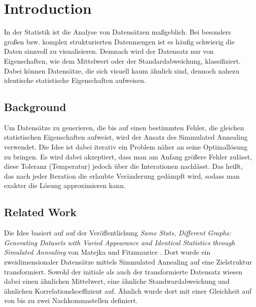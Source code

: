 \documentclass[sigconf]{acmart}
\begin{document}


\maketitle

\let\thefootnote\relax{}


\section{Introduction}

In der Statistik ist die Analyse von Datensätzen maßgeblich. Bei besonders großen bzw. komplex strukturierten Datenmengen ist es häufig schwierig die Daten sinnvoll zu visualisieren. Demnach wird der Datensatz nur von Eigenschaften, wie dem Mittelwert oder der Standardabweichung, klassifiziert. Dabei können Datensätze, die sich visuell kaum ähnlich sind, dennoch nahezu identische statistische Eigenschaften aufweisen. 

\subsection{Background}

Um Datensätze zu generieren, die bis auf einen bestimmten Fehler, die gleichen statistischen Eigenschaften aufweist, wird der Ansatz des Simmulated Annealing verwendet. Die Idee ist dabei iterativ ein Problem näher an seine Optimallösung zu bringen. Es wird dabei akzeptiert, dass man am Anfang größere Fehler zulässt, diese Toleranz (Temperatur) jedoch über die Interationen nachlässt. Das heißt, das nach jeder Iteration die erlaubte Veränderung gedämpft wird, sodass man exakter die Lösung approximieren kann.

\subsection{Related Work}

Die Idee basiert auf auf der Veröffentlichung \textit{Same Stats, Different Graphs: Generating Datasets with Varied Appearance and Identical Statistics through Simulated Annealing} von Matejka und Fitzmaurice \cite{matejka2017same}. Dort wurde ein zweidimensionaler Datensätze mittels Simmulated Annealing auf eine Zielstruktur transformiert. Sowohl der initiale als auch der transformierte Datensatz wiesen dabei einen ähnlichen Mittelwert, eine ähnliche Standwardabweichung und ähnlichen Korrelationskoeffizient auf. Ähnlich wurde dort mit einer Gleichheit auf von bis zu zwei Nachkommastellen definiert.
\end{document}
